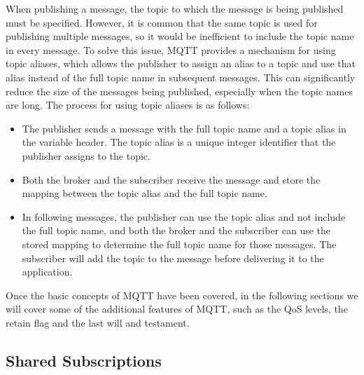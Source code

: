 \begin{itemize}
    When publishing a message, the topic to which the message is being published must be specified. However, it is common that the same topic is used for publishing multiple messages, so it would be inefficient to include the topic name in every message. To solve this issue, MQTT provides a mechanism for using topic aliases, which allows the publisher to assign an alias to a topic and use that alias instead of the full topic name in subsequent messages. This can significantly reduce the size of the messages being published, especially when the topic names are long. The process for using topic aliases is as follows:
    \begin{itemize}
        \item The publisher sends a message with the full topic name and a topic alias in the variable header. The topic alias is a unique integer identifier that the publisher assigns to the topic.
        \item Both the broker and the subscriber receive the message and store the mapping between the topic alias and the full topic name.
        \item In following messages, the publisher can use the topic alias and not include the full topic name, and both the broker and the subscriber can use the stored mapping to determine the full topic name for those messages. The subscriber will add the topic to the message before delivering it to the application.
    \end{itemize}
\end{itemize}

Once the basic concepts of MQTT have been covered, in the following sections we will cover some of the additional features of MQTT, such as the QoS levels, the retain flag and the last will and testament.

\subsection{Shared Subscriptions}

